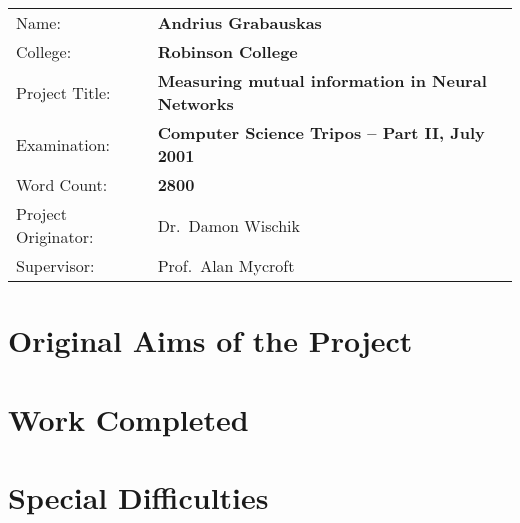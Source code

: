 {\large
\begin{tabular}{ll}
Name:               & \bf Andrius Grabauskas                    \\
College:            & \bf Robinson College                      \\
Project Title:      & \bf Measuring mutual information in Neural Networks \\
Examination:        & \bf Computer Science Tripos -- Part II, July 2001  \\
Word Count:         & \bf 2800\footnotemark[1] \\
Project Originator: & Dr.\ Damon Wischik                  \\
Supervisor:         & Prof.\ Alan Mycroft                 \\ 
\end{tabular}
}


\section*{Original Aims of the Project}

\section*{Work Completed}

\section*{Special Difficulties}

\newpage
